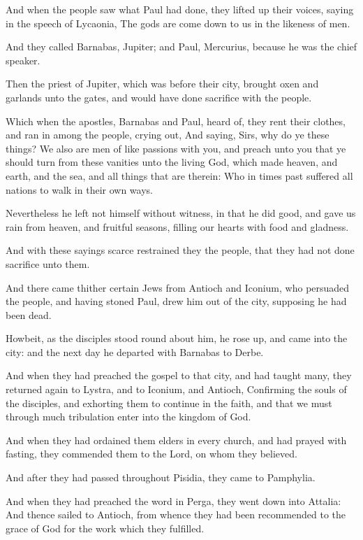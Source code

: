 \Verse And when the people saw what Paul had done, they lifted up their voices, saying in the speech of Lycaonia, The gods are come down to us in the likeness of men.

\Verse And they called Barnabas, Jupiter; and Paul, Mercurius, because he was the chief speaker.

\Verse Then the priest of Jupiter, which was before their city, brought oxen and garlands unto the gates, and would have done sacrifice with the people.

\Verse Which when the apostles, Barnabas and Paul, heard of, they rent their clothes, and ran in among the people, crying out, \Verse And saying, Sirs, why do ye these things? We also are men of like passions with you, and preach unto you that ye should turn from these vanities unto the living God, which made heaven, and earth, and the sea, and all things that are therein: \Verse Who in times past suffered all nations to walk in their own ways.

\Verse Nevertheless he left not himself without witness, in that he did good, and gave us rain from heaven, and fruitful seasons, filling our hearts with food and gladness.

\Verse And with these sayings scarce restrained they the people, that they had not done sacrifice unto them.

\Verse And there came thither certain Jews from Antioch and Iconium, who persuaded the people, and having stoned Paul, drew him out of the city, supposing he had been dead.

\Verse Howbeit, as the disciples stood round about him, he rose up, and came into the city: and the next day he departed with Barnabas to Derbe.

\Verse And when they had preached the gospel to that city, and had taught many, they returned again to Lystra, and to Iconium, and Antioch, \Verse Confirming the souls of the disciples, and exhorting them to continue in the faith, and that we must through much tribulation enter into the kingdom of God.

\Verse And when they had ordained them elders in every church, and had prayed with fasting, they commended them to the Lord, on whom they believed.

\Verse And after they had passed throughout Pisidia, they came to Pamphylia.

\Verse And when they had preached the word in Perga, they went down into Attalia: \Verse And thence sailed to Antioch, from whence they had been recommended to the grace of God for the work which they fulfilled.

